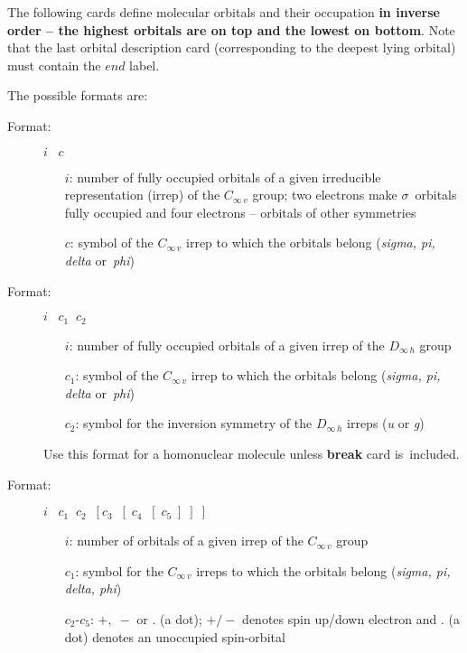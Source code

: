 \documentclass[10pt,a4paper]{article}
\begin{document}
\begin{description}
The following cards define molecular orbitals and their occupation
{\bf in inverse order -- the highest orbitals are on top and the lowest
  on bottom}. Note that the last orbital description card
(corresponding to the deepest lying orbital) must contain the $end$
label.

The possible formats are:
\begin{description}
\item[Format:] $i\;\;\;c$
\begin{itemize}
\item[$i$:] number of fully occupied orbitals of a given irreducible
     representation (irrep) of the $C_{\infty\,v}$ group;
	two electrons make $\sigma$~orbitals fully occupied
     and four electrons -- orbitals of other symmetries
\item[$c$:] symbol of the $C_{\infty\,v}$ irrep to which the orbitals
     belong ({\it sigma, pi, delta} or~{\it phi})
\end{itemize}
\end{description}


\begin{description}
\item[Format:] $i\;\;\;c_1 \;\;c_2$
\begin{itemize}
\item[$i$:] number of fully occupied orbitals of a given irrep of the
$D_{\infty\,h}$ group
\item[$c_1$:] symbol of the $C_{\infty\,v}$ irrep to which the orbitals belong
       ({\it sigma, pi, delta} or~{\it phi})
\item[$c_2$:] symbol for the inversion symmetry of the $D_{\infty\,h}$ irreps
       ({\it u} or {\it g})
\end{itemize}
Use this format for a homonuclear molecule unless \textbf{break} card
is~included.
\end{description}


\begin{description}
\item[Format:]
$i\;\;\;c_1\;\;c_2\;\;[c_3\;\;[\;c_4\;\;[\;c_5\;]\;]\;]$
\begin{itemize}
\item[$i$:] number of orbitals of a given irrep of the $C_{\infty\,v}$  group
\item[$c_1$:] symbol for the $C_{\infty\,v}$ irreps to which the
orbitals belong ({\it sigma, pi, delta, phi})
\item[$c_2$-$c_5$:] $+,\;-$ or . (a dot); $+/-$ denotes spin up/down
electron and . (a dot) denotes an unoccupied spin-orbital
\end{itemize}
\end{description}


\end{description}
\end{document}
